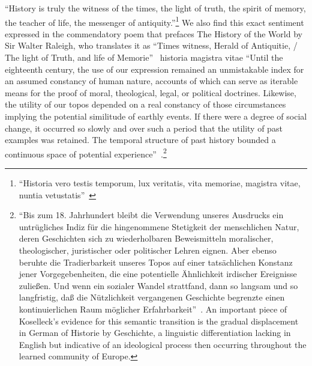 ``History is truly the witness of the times, the light of truth, the spirit of memory, the teacher of life, the messenger of antiquity.''\footnote{``Historia vero testis temporum, lux veritatis, vita memoriae, magistra vitae, nuntia vetustatis''~\cite[2.36]{cicero_oratore_1979}} 
We also find this exact sentiment expressed in the commendatory poem that prefaces The History of the World by Sir Walter Raleigh, who translates it as ``Times witness, Herald of Antiquitie, / The light of Truth, and life of Memorie''~\cite[N. pag.]{raleigh_history_1614}
historia magistra vitae ``Until the eighteenth century, the use of our expression remained an unmistakable index for an assumed constancy of human nature, accounts of which can serve as iterable means for the proof of moral, theological, legal, or political doctrines. Likewise, the utility of our topos depended on a real constancy of those circumstances implying the potential similitude of earthly events. If there were a degree of social change, it occurred so slowly and over such a period that the utility of past examples was retained. The temporal structure of past history bounded a continuous space of potential experience''~\cite[28]{koselleck_futures_2004}.\footnote{``Bis zum 18. Jahrhundert bleibt die Verwendung unseres Ausdrucks ein untrügliches Indiz für die hingenommene Stetigkeit der menschlichen Natur, deren Geschichten sich zu wiederholbaren Beweismitteln moralischer, theologischer, juristischer oder politischer Lehren eignen. Aber ebenso beruhte die Tradierbarkeit unseres Topos auf einer tatsächlichen Konstanz jener Vorgegebenheiten, die eine potentielle Ähnlichkeit irdischer Ereignisse zuließen. Und wenn ein sozialer Wandel strattfand, dann so langsam und so langfristig, daß die Nützlichkeit vergangenen Geschichte begrenzte einen kontinuierlichen Raum möglicher Erfahrbarkeit''~\cite[40]{koselleck_vergangene_1979}. An important piece of Koselleck's evidence for this semantic transition is the gradual displacement in German of Historie by Geschichte, a linguistic differentiation lacking in English but indicative of an ideological process then occurring throughout the learned community of Europe.}

